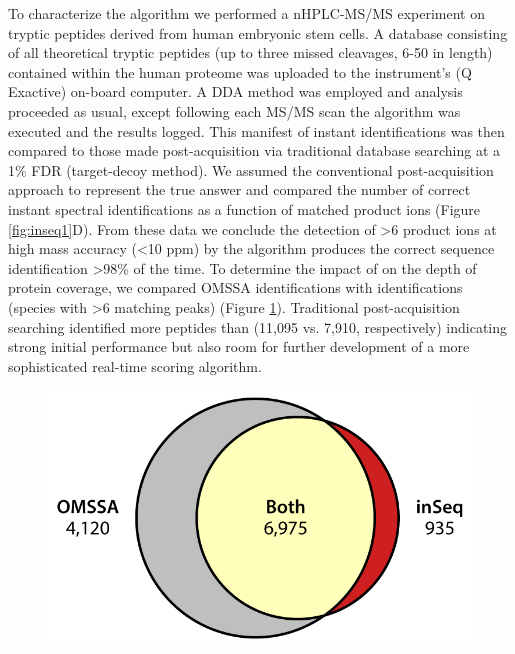 To characterize the \inseq{} algorithm we performed a nHPLC-MS/MS experiment on tryptic peptides derived from human embryonic stem cells. A database consisting of all theoretical tryptic peptides (up to three missed cleavages, 6-50 in length) contained within the human proteome was uploaded to the instrument's (Q Exactive) on-board computer. A DDA method was employed and analysis proceeded as usual, except following each MS/MS scan the \inseq{} algorithm was executed and the results logged. This manifest of instant identifications was then compared to those made post-acquisition via traditional database searching at a 1\% FDR (target-decoy method). We assumed the conventional post-acquisition approach to represent the true answer and compared the number of correct instant spectral identifications as a function of matched product ions (Figure \ref{fig:inseq1}D). From these data we conclude the detection of >6 product ions at high mass accuracy (<10 ppm) by the \inseq{} algorithm produces the correct sequence identification >98\% of the time. To determine the impact of \inseq{} on the depth of protein coverage, we compared OMSSA identifications with \inseq{} identifications (species with >6 matching peaks) (Figure \ref{fig:inseqs3}). Traditional post-acquisition searching identified more peptides than \inseq{} (11,095 vs. 7,910, respectively) indicating strong initial performance but also room for further development of a more sophisticated real-time scoring algorithm.
\begin{figure}
	\centering
	\includegraphics[width=\columnwidth]{inseq/inSeq_Fig S3.png}
	\label{fig:inseqs3}
\end{figure}


